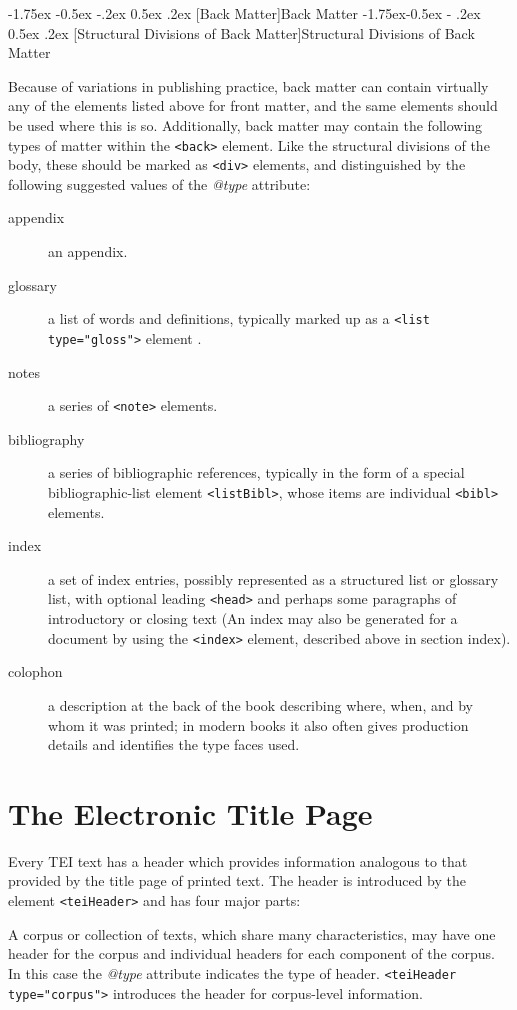 \documentclass[11pt,twoside]{article}\makeatletter
\makeatletter
\renewcommand\section{\@startsection {section}{1}{\z@}%
     {-1.75ex \@plus -0.5ex \@minus -.2ex}%
     {0.5ex \@plus .2ex}%
     {\reset@font\Large\bfseries\sffamily}}
\renewcommand\subsection{\@startsection{subsection}{2}{\z@}%
     {-1.75ex\@plus -0.5ex \@minus- .2ex}%
     {0.5ex \@plus .2ex}%
     {\reset@font\Large\sffamily}}
\renewcommand\subsubsection{\@startsection{subsubsection}{3}{\z@}%
     {-1.5ex\@plus -0.35ex \@minus -.2ex}%
     {0.5ex \@plus .2ex}%
     {\reset@font\large\sffamily}}
\def\DivI{\section}
\def\DivII{\subsection}
\def\DivIII{\subsubsection}
\def\DivI{\chapter}
\def\DivII{\section}
\def\DivIII{\subsection}
\makeatother
\begin{document}
\DivII[Back Matter]{Back Matter}
\DivIII[Structural Divisions of Back Matter]{Structural Divisions of Back Matter}\par
Because of variations in publishing practice, back matter can contain virtually any of the elements listed above for front matter, and the same elements should be used where this is so.  Additionally, back matter may contain the following types of matter within the \texttt{<back>} element.  Like the structural divisions of the body, these should be marked as  \texttt{<div>} elements, and distinguished by the following suggested values of the \textit{@type} attribute: \begin{description}

\item[appendix]an appendix.
\item[glossary]a list of words and definitions, typically marked up as a  \texttt{<list type="gloss">} element .
\item[notes]a series of \texttt{<note>} elements.
\item[bibliography]a series of bibliographic references, typically in the form of a special bibliographic-list element \texttt{<listBibl>}, whose items are individual \texttt{<bibl>} elements.
\item[index]a set of index entries, possibly represented as a structured list or glossary list, with optional leading \texttt{<head>} and perhaps some paragraphs of introductory or closing text (An index may also be generated for a document by using the \texttt{<index>} element, described above in section  index).
\item[colophon]a description at the back of the book describing where, when, and by whom it was printed; in modern books it also often gives production details and identifies the type faces used.
\end{description} 
\DivI[The Electronic Title Page]{The Electronic Title Page}\label{U5-header}\par
Every TEI text has a header which provides information analogous to that provided by the title page of printed text. The header is introduced by the element \texttt{<teiHeader>} and has four major parts: \par
    A corpus or collection of texts, which share many characteristics, may have one header for the corpus and individual headers for each component of the corpus.  In this case the \textit{@type} attribute indicates the type of header. \texttt{<teiHeader type="corpus">} introduces the header for corpus-level information.\par
\end{document}
